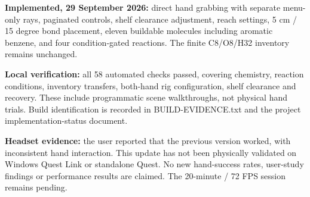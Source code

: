 \textbf{Implemented, 29 September 2026:} direct hand grabbing with separate menu-only rays, paginated controls, shelf clearance adjustment, reach settings, 5 cm / 15 degree bond placement, eleven buildable molecules including aromatic benzene, and four condition-gated reactions. The finite C8/O8/H32 inventory remains unchanged.

\textbf{Local verification:} all 58 automated checks passed, covering chemistry, reaction conditions, inventory transfers, both-hand rig configuration, shelf clearance and recovery. These include programmatic scene walkthroughs, not physical hand trials. Build identification is recorded in BUILD-EVIDENCE.txt and the project implementation-status document.

\textbf{Headset evidence:} the user reported that the previous version worked, with inconsistent hand interaction. This update has not been physically validated on Windows Quest Link or standalone Quest. No new hand-success rates, user-study findings or performance results are claimed. The 20-minute / 72 FPS session remains pending.
